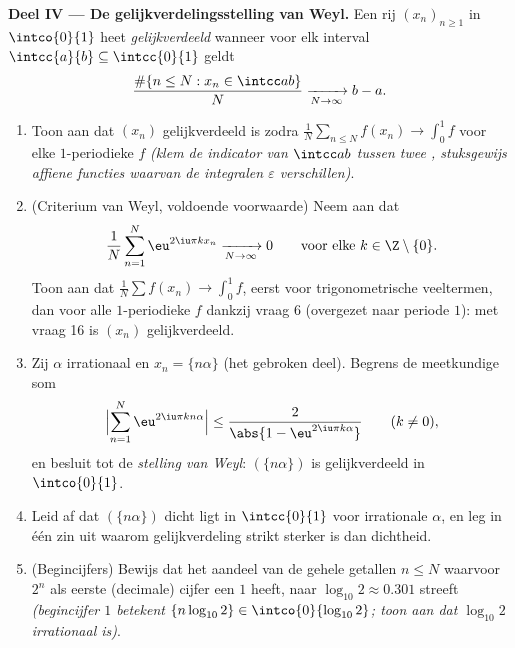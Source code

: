 \begin{problem}
\medskip
\noindent\textbf{Deel IV --- De gelijkverdelingsstelling van
Weyl.} Een rij $(x_n)_{n\geq1}$ in $\intco{0}{1}$ heet
\emph{gelijkverdeeld} wanneer voor elk interval $\intcc{a}{b}
\subseteq \intcc{0}{1}$ geldt
\[
\frac{\#\{n \leq N : x_n \in \intcc ab\}}{N}
\xrightarrow[N\to\infty]{} b - a .
\]
\begin{enumerate}[resume]
  \item Toon aan dat $(x_n)$ gelijkverdeeld is zodra
        $\frac1N\sum_{n\leq N}f(x_n) \to \int_0^1 f$ voor elke
        \emph{} $1$-periodieke $f$ \emph{(klem de
        indicator van $\intcc ab$ tussen twee ,
        stuksgewijs affiene functies waarvan de integralen $\varepsilon$
        verschillen)}.
  \item (Criterium van Weyl, voldoende voorwaarde) Neem aan dat
        \[
        \frac{1}{N}\sum_{n=1}^{N}\eu^{2\iu\pi kx_n}
        \xrightarrow[N\to\infty]{} 0
        \qquad\text{voor elke } k \in \Z\setminus\{0\} .
        \]
        Toon aan dat $\frac1N\sum f(x_n) \to \int_0^1f$, eerst
        voor trigonometrische veeltermen, dan voor alle 
        $1$-periodieke $f$ dankzij vraag 6 (overgezet naar periode
        $1$): met vraag 16 is $(x_n)$ gelijkverdeeld.
  \item Zij $\alpha$ irrationaal en $x_n = \{n\alpha\}$ (het
        gebroken deel). Begrens de meetkundige som
        \[
        \Bigl|\sum_{n=1}^{N}\eu^{2\iu\pi kn\alpha}\Bigr|
        \leq \frac{2}{\abs{1 - \eu^{2\iu\pi k\alpha}}}
        \qquad (k \neq 0),
        \]
        en besluit tot de \emph{stelling van Weyl}:
        $(\{n\alpha\})$ is gelijkverdeeld in $\intco{0}{1}$.
  \item Leid af dat $(\{n\alpha\})$ dicht ligt in $\intcc{0}{1}$
        voor irrationale $\alpha$, en leg in één zin uit waarom
        gelijkverdeling strikt sterker is dan dichtheid.
  \item (Begincijfers) Bewijs dat het aandeel van de gehele
        getallen $n \leq N$ waarvoor $2^n$ als eerste (decimale)
        cijfer een $1$ heeft, naar $\log_{10}2 \approx 0.301$
        streeft \emph{(begincijfer $1$ betekent
        $\{n\log_{10}2\} \in \intco{0}{\log_{10}2}$; toon aan dat
        $\log_{10}2$ irrationaal is)}.
\end{enumerate}


\end{problem}
